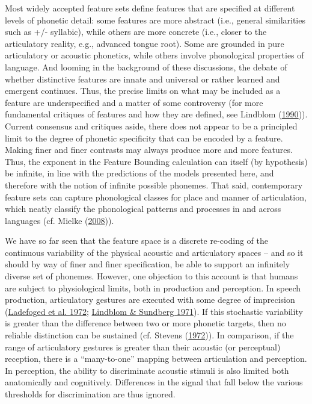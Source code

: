 \documentclass[
]{article}
\begin{document}
Most widely accepted feature sets define features that are specified at
different levels of phonetic detail: some features are more abstract
(i.e., general similarities such as +/- syllabic), while others are more
concrete (i.e., closer to the articulatory reality, e.g., advanced
tongue root). Some are grounded in pure articulatory or acoustic
phonetics, while others involve phonological properties of language. And
looming in the background of these discussions, the debate of whether
distinctive features are innate and universal or rather learned and
emergent continues. Thus, the precise limits on what may be included as
a feature are underspecified and a matter of some controversy (for more
fundamental critiques of features and how they are defined, see Lindblom
(\protect\hyperlink{ref-Lindblom1990a}{1990})). Current consensus and
critiques aside, there does not appear to be a principled limit to the
degree of phonetic specificity that can be encoded by a feature. Making
finer and finer contrasts may always produce more and more features.
Thus, the exponent in the Feature Bounding calculation can itself (by
hypothesis) be infinite, in line with the predictions of the models
presented here, and therefore with the notion of infinite possible
phonemes. That said, contemporary feature sets can capture phonological
classes for place and manner of articulation, which neatly classify the
phonological patterns and processes in and across languages (cf. Mielke
(\protect\hyperlink{ref-Mielke2008}{2008})).

We have so far seen that the feature space is a discrete re-coding of
the continuous variability of the physical acoustic and articulatory
spaces -- and so it should by way of finer and finer specification, be
able to support an infinitely diverse set of phonemes. However, one
objection to this account is that humans are subject to physiological
limits, both in production and perception. In speech production,
articulatory gestures are executed with some degree of imprecision
(\protect\hyperlink{ref-Ladefoged_etal1972}{Ladefoged et al. 1972};
\protect\hyperlink{ref-LindblomSundberg1971}{Lindblom \& Sundberg
1971}). If this stochastic variability is greater than the difference
between two or more phonetic targets, then no reliable distinction can
be sustained (cf. Stevens (\protect\hyperlink{ref-Stevens1972}{1972})).
In comparison, if the range of articulatory gestures is greater than
their acoustic (or perceptual) reception, there is a ``many-to-one''
mapping between articulation and perception. In perception, the ability
to discriminate acoustic stimuli is also limited both anatomically and
cognitively. Differences in the signal that fall below the various
thresholds for discrimination are thus ignored.
\end{document}
